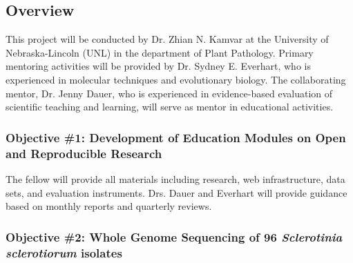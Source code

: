\documentclass[12pt,letterpaper]{article}
\title{\ruleline{Management Plan}}
\begin{document}
\maketitle



\subsection{Overview}

This project will be conducted by Dr. Zhian N. Kamvar at the University of Nebraska-Lincoln (UNL) in the department of Plant Pathology. 
Primary mentoring activities will be provided by Dr. Sydney E. Everhart, who is experienced in molecular techniques and evolutionary biology. 
The collaborating mentor, Dr. Jenny Dauer, who is experienced in evidence-based evaluation of scientific teaching and learning, will serve as mentor in educational activities.


\subsubsection{Objective \#1: Development of Education Modules on Open and Reproducible Research}

The fellow will provide all materials including research, web infrastructure, data sets, and evaluation instruments. 
Drs. Dauer and Everhart will provide guidance based on monthly reports and quarterly reviews.

\subsubsection{Objective \#2: Whole Genome Sequencing of 96 \textit{Sclerotinia sclerotiorum} isolates}
\end{document}
